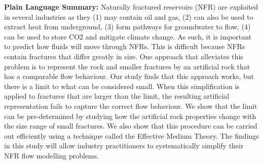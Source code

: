 \documentclass[draft]{agujournal2018}
\begin{document}
\textbf{Plain Language Summary:} Naturally fractured reservoirs (NFR) are exploited in several industries as they (1) may contain oil and gas, (2) can also be used to extract heat from underground, (3) form pathways for groundwater to flow, (4) can be used to store CO2 and mitigate climate change. As such, it is important to predict how fluids will move through NFRs. This is difficult because NFRs contain fractures that differ greatly in size. One approach that alleviates this problem is to represent the rock and smaller fractures by an artificial rock that has a comparable flow behaviour. Our study finds that this approach works, but there is a limit to what can be considered small. When this simplification is applied to fractures that are larger than the limit, the resulting artificial representation fails to capture the correct flow behaviour. We show that the limit can be pre-determined by studying how the artificial rock properties change with the size range of small fractures. We also show that this procedure can be carried out efficiently using a technique called the Effective Medium Theory. The findings in this study will allow industry practitioners to systematically simplify their NFR flow modelling problems.



%
%

%


%
%
%
%
\end{document}
